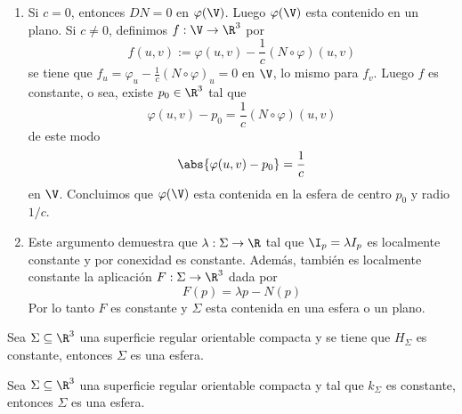 \documentclass{article}
\begin{document}
\begin{dem}
\begin{enumerate}
        \item Si $c=0$, entonces $DN=0$ en $\varphi(\V)$. Luego $\varphi(\V)$ esta contenido en un
        plano. Si $c\neq0$, definimos $f:\V\to\R^{3}$ por
        \begin{equation*}
            f(u,v):=\varphi(u,v)-\frac{1}{c}(N\circ\varphi)(u,v)
        \end{equation*}
        se tiene que $f_{u}=\varphi_{u}-\frac{1}{c}(N\circ\varphi)_{u}=0$ en $\V$, lo mismo para
        $f_{v}$. Luego $f$ es constante, o sea, existe $p_{0}\in\R^{3}$ tal que
        \begin{equation*}
            \varphi(u,v)-p_{0}=\frac{1}{c}(N\circ\varphi)(u,v)
        \end{equation*}
        de este modo
        \begin{equation*}
            \abs{\varphi(u,v)-p_{0}}=\frac{1}{c}
        \end{equation*}
        en $\V$. Concluimos que $\varphi(\V)$ esta contenida en la esfera de centro $p_{0}$ y radio
        $1/c$.

        \item Este argumento demuestra que $\lambda:\Sigma\to\R$ tal que $\I_{p}=\lambda I_{p}$ es
        localmente constante y por conexidad es constante. Además, también es localmente constante
        la aplicación $F:\Sigma\to\R^{3}$ dada por
        \begin{equation*}
            F(p)=\lambda p-N(p)
        \end{equation*}
        Por lo tanto $F$ es constante y $\Sigma$ esta contenida en una esfera o un plano.
    \end{enumerate}
\end{dem}
\begin{teo}
    Sea $\Sigma\subseteq\R^{3}$ una superficie regular orientable compacta y se tiene que 
    $H_{\Sigma}$ es constante, entonces $\Sigma$ es una esfera.
\end{teo}
\begin{teo}
    Sea $\Sigma\subseteq\R^{3}$ una superficie regular orientable compacta y tal que $k_{\Sigma}$
    es constante, entonces $\Sigma$ es una esfera.
\end{teo}
\end{document}
